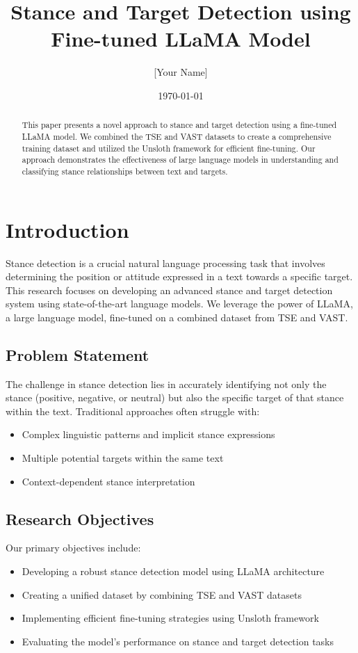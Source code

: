 \documentclass[twocolumn]{article}
\title{Stance and Target Detection using Fine-tuned LLaMA Model}
\author{[Your Name]}
\date{\today}
\begin{document}
\maketitle

\begin{abstract}
This paper presents a novel approach to stance and target detection using a fine-tuned LLaMA model. We combined the TSE and VAST datasets to create a comprehensive training dataset and utilized the Unsloth framework for efficient fine-tuning. Our approach demonstrates the effectiveness of large language models in understanding and classifying stance relationships between text and targets.
\end{abstract}

\section{Introduction}
Stance detection is a crucial natural language processing task that involves determining the position or attitude expressed in a text towards a specific target. This research focuses on developing an advanced stance and target detection system using state-of-the-art language models. We leverage the power of LLaMA, a large language model, fine-tuned on a combined dataset from TSE and VAST.

\subsection{Problem Statement}
The challenge in stance detection lies in accurately identifying not only the stance (positive, negative, or neutral) but also the specific target of that stance within the text. Traditional approaches often struggle with:
\begin{itemize}
    \item Complex linguistic patterns and implicit stance expressions
    \item Multiple potential targets within the same text
    \item Context-dependent stance interpretation
\end{itemize}

\subsection{Research Objectives}
Our primary objectives include:
\begin{itemize}
    \item Developing a robust stance detection model using LLaMA architecture
    \item Creating a unified dataset by combining TSE and VAST datasets
    \item Implementing efficient fine-tuning strategies using Unsloth framework
    \item Evaluating the model's performance on stance and target detection tasks
\end{itemize}
\end{document}
